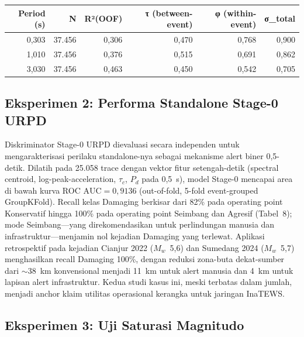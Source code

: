 \documentclass[10pt]{article}
\begin{document}
\begin{longtable}[]{@{}rrrrrr@{}}
\toprule
Period (s) & N & R²(OOF) & τ (between-event) & φ (within-event) & σ\_total\tabularnewline
\midrule
\endhead
0,303 & 37.456 & 0,306 & 0,470 & 0,768 & 0,900\tabularnewline
1,010 & 37.456 & 0,376 & 0,515 & 0,691 & 0,862\tabularnewline
3,030 & 37.456 & 0,463 & 0,450 & 0,542 & 0,705\tabularnewline
\bottomrule
\end{longtable}
\subsection{Eksperimen 2: Performa Standalone Stage-0 URPD}

Diskriminator Stage-0 URPD dievaluasi secara independen untuk mengarakterisasi perilaku standalone-nya sebagai mekanisme alert biner 0,5-detik. Dilatih pada 25.058 trace dengan vektor fitur setengah-detik (spectral centroid, log-peak-acceleration, $\tau_c$, $P_d$ pada 0,5~s), model Stage-0 mencapai area di bawah kurva ROC $\mathrm{AUC} = 0,9136$ (out-of-fold, 5-fold event-grouped GroupKFold). Recall kelas Damaging berkisar dari 82\% pada operating point Konservatif hingga 100\% pada operating point Seimbang dan Agresif (Tabel~8); mode Seimbang---yang direkomendasikan untuk perlindungan manusia dan infrastruktur---menjamin nol kejadian Damaging yang terlewat. Aplikasi retrospektif pada kejadian Cianjur 2022 ($M_w$~5,6) dan Sumedang 2024 ($M_w$~5,7) menghasilkan recall Damaging 100\%, dengan reduksi zona-buta dekat-sumber dari $\sim$38~km konvensional menjadi 11~km untuk alert manusia dan 4~km untuk lapisan alert infrastruktur. Kedua studi kasus ini, meski terbatas dalam jumlah, menjadi anchor klaim utilitas operasional kerangka untuk jaringan InaTEWS.

\subsection{Eksperimen 3: Uji Saturasi Magnitudo}
\end{document}
